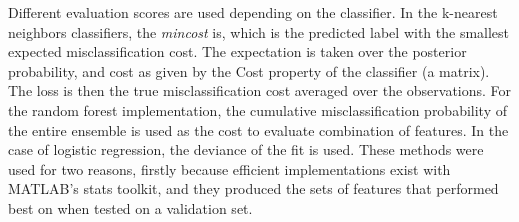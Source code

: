 Different evaluation scores are used depending on the classifier. In the k-nearest neighbors classifiers, the \textit{mincost} is, which is the predicted label with the smallest expected misclassification cost. The expectation is taken over the posterior probability, and cost as given by the Cost property of the classifier (a matrix). The loss is then the true misclassification cost averaged over the observations. For the random forest implementation, the cumulative misclassification probability of the entire ensemble is used as the cost to evaluate combination of features. In the case of logistic regression, the deviance of the fit is used. These methods were used for two reasons, firstly because efficient implementations exist with MATLAB's stats toolkit, and they produced the sets of features that performed best on when tested on a validation set.